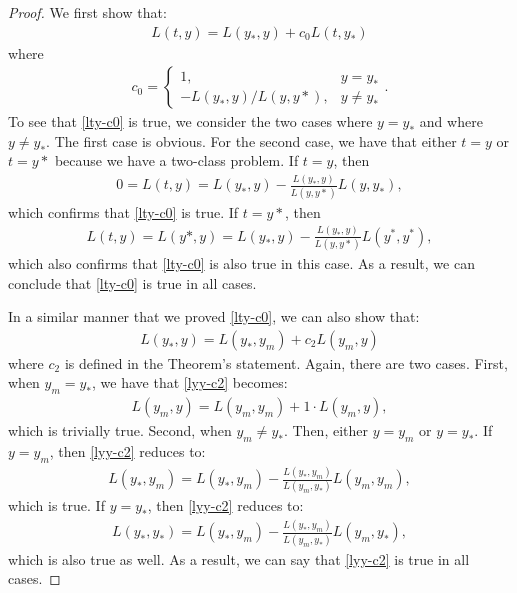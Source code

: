 \documentclass[10pt]{article}
\begin{document}
\begin{itemize}
    \begin{proof}
      We first show that:
      \begin{align} 
        L(t,y) = L(y_*, y) + c_0 L(t,y_*) \label{lty-c0}
      \end{align}
      where
      \begin{align*}
        c_0 = \begin{cases}
          1, & y=y_* \\
          -L(y_*,y)/L(y,y*), & y \neq y_*
        \end{cases}.
      \end{align*}
      To see that \eqref{lty-c0} is true, we consider the two cases where $y = y_*$ and where $y \neq y_*$. The first case is obvious. For the second case, we have that either $t = y$ or $t = y*$ because we have a two-class problem. If $t = y$, then
      \begin{align*}
        0 = L(t,y) = L(y_*, y) - \frac{L(y_*,y)}{L(y,y*)} L(y,y_*),
      \end{align*}
      which confirms that \eqref{lty-c0} is true. If $t = y*$, then
      \begin{align*}
        L(t,y) = L(y*,y) = L(y_*,y) - \frac{L(y_*,y)}{L(y,y*)} L(y^*, y^*),
      \end{align*}
      which also confirms that \eqref{lty-c0} is also true in this case. As a result, we can conclude that \eqref{lty-c0} is true in all cases.

      In a similar manner that we proved \eqref{lty-c0}, we can also show that:
      \begin{align}
        L(y_*,y) = L(y_*,y_m) + c_2 L(y_m, y) \label{lyy-c2}
      \end{align}
      where $c_2$ is defined in the Theorem's statement. Again, there are two cases. First, when $y_m = y_*$, we have that \eqref{lyy-c2} becomes:
      \begin{align*}
        L(y_m, y) = L(y_m,y_m) + 1 \cdot L(y_m, y),
      \end{align*}
      which is trivially true. Second, when $y_m \neq y_*$. Then, either $y = y_m$ or $y = y_*$. If $y = y_m$, then \eqref{lyy-c2} reduces to:
      \begin{align*}
        L(y_*, y_m) = L(y_*, y_m) - \frac{L(y_*, y_m)}{L(y_m, y_*)} L(y_m,y_m),
      \end{align*}
      which is true. If $y = y_*$, then \eqref{lyy-c2} reduces to:
      \begin{align*}
        L(y_*,y_*) = L(y_*,y_m) - \frac{L(y_*, y_m)}{L(y_m, y_*)} L(y_m,y_*),
      \end{align*}
      which is also true as well. As a result, we can say that \eqref{lyy-c2} is true in all cases.


\end{proof}
\end{itemize}
\end{document}

